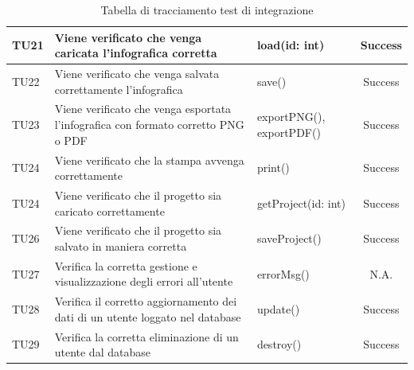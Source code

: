 \begin{table}[h]
\begin{center}
\begin{tabular}{|l|p{}|p{}|c|}
		TU21 & Viene verificato che venga caricata l'infografica corretta & load(id: int) & Success\\
	\midrule
		TU22 & Viene verificato che venga salvata correttamente l'infografica & save() & Success\\
	\midrule
		TU23 & Viene verificato che venga esportata l'infografica con formato corretto PNG o PDF &  exportPNG(), exportPDF() & Success\\
	\midrule
		TU24 & Viene verificato che la stampa avvenga correttamente &  print() & Success\\
	\midrule
		TU24 & Viene verificato che il progetto sia caricato correttamente & getProject(id: int) & Success\\
	\midrule
		TU26 & Viene verificato che il progetto sia salvato in maniera corretta &  saveProject() & Success\\
	\midrule
		TU27 & Verifica la corretta gestione e visualizzazione degli errori all'utente&  errorMsg() & N.A.\\
	\midrule
		TU28 & Verifica il corretto aggiornamento dei dati di un utente loggato nel database &  update() & Success\\
	\midrule
		TU29 & Verifica la corretta eliminazione di un utente dal database &  destroy() & Success\\
	\bottomrule
	\end{tabular}
	\end{center}
	\caption{Tabella di tracciamento test di integrazione}
\end{table}